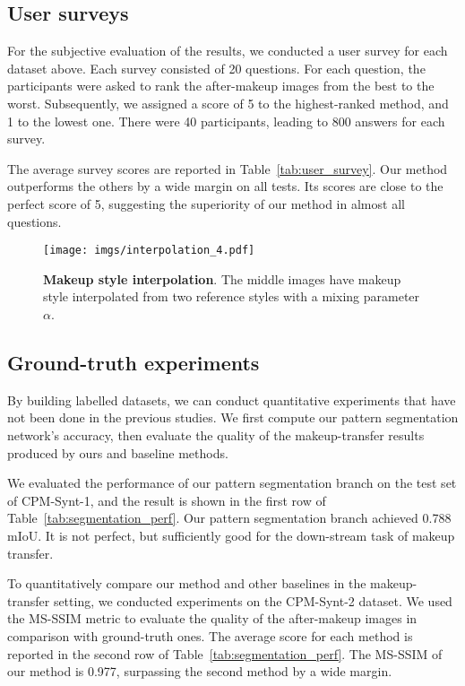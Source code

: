 \documentclass[final]{cvpr}
\newcommand{\Tref}[1]{Table~\ref{#1}}
\begin{document}
\subsection{User surveys}
For the subjective evaluation of the results, we conducted a user survey for each dataset above. Each survey consisted of 20 questions. For each question, the participants were asked to rank the after-makeup images from the best to the worst. Subsequently, we assigned a score of 5 to the highest-ranked method, and 1 to the lowest one. There were 40 participants, leading to 800 answers for each survey. 




The average survey scores are reported in \Tref{tab:user_survey}. Our method outperforms the others by a wide margin on all tests. Its scores are close to the perfect score of 5, suggesting the superiority of our method in almost all questions. 

\begin{figure*}[t]
\centering 
\texttt{[image: imgs/interpolation\_4.pdf]}
\vskip -0.1in
\caption{{\bf Makeup style interpolation}. The middle images have makeup style interpolated from two reference styles with a mixing parameter $\alpha$.}
\label{fig:interpolation}
\vspace{-5mm}
\end{figure*}


\subsection{Ground-truth experiments}
\vspace{-1mm}
By building labelled datasets, we can conduct quantitative experiments that have not been done in the previous studies. We first compute our pattern segmentation network's accuracy, then evaluate the quality of the makeup-transfer results produced by ours and baseline methods.

We evaluated the performance of our pattern segmentation branch on the test set of CPM-Synt-1, and the result is shown in the first row of \Tref{tab:segmentation_perf}. Our pattern segmentation branch achieved 0.788 mIoU. It is not perfect, but sufficiently good for the down-stream task of makeup transfer. 





To quantitatively compare our method and other baselines in the makeup-transfer setting, we conducted experiments on the CPM-Synt-2 dataset. We used the MS-SSIM metric to evaluate the quality of the after-makeup images in comparison with ground-truth ones. The average score for each method is reported in the second row of \Tref{tab:segmentation_perf}. The MS-SSIM of our method is 0.977, surpassing the second method by a wide margin.
\end{document}
